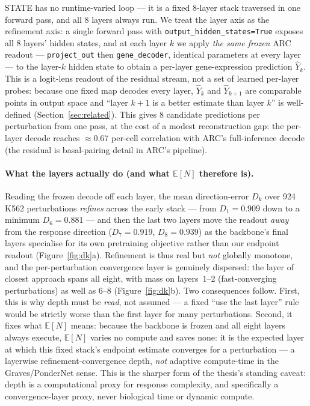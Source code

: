 \documentclass[11pt]{article}
\newcommand{\EN}{\ensuremath{\mathbb{E}[N]}}
\begin{document}
STATE has no runtime-varied loop --- it is a fixed 8-layer stack traversed in one forward pass,
and all 8 layers always run. We treat the layer axis as the refinement axis: a single forward pass
with \texttt{output\_hidden\_states=True} exposes all 8 layers' hidden states, and at each layer
$k$ we apply \emph{the same frozen} ARC readout --- \texttt{project\_out} then
\texttt{gene\_decoder}, identical parameters at every layer --- to the layer-$k$ hidden state to
obtain a per-layer gene-expression prediction $\hat{Y}_k$. This is a logit-lens readout of the
residual stream, not a set of learned per-layer probes: because one fixed map decodes every layer,
$\hat{Y}_k$ and $\hat{Y}_{k+1}$ are comparable points in output space and ``layer $k+1$ is a better
estimate than layer $k$'' is well-defined (Section~\ref{sec:related}). This gives 8 candidate
predictions per perturbation from one pass, at the cost of a modest reconstruction gap: the
per-layer decode reaches $\approx0.67$ per-cell correlation with ARC's full-inference decode (the
residual is basal-pairing detail in ARC's pipeline).

\paragraph{What the layers actually do (and what \EN{} therefore is).} Reading the frozen decode
off each layer, the mean direction-error $D_k$ over 924 K562 perturbations \emph{refines} across the
early stack --- from $D_1=0.909$ down to a minimum $D_6=0.881$ --- and then the last two layers move
the readout \emph{away} from the response direction ($D_7=0.919$, $D_8=0.939$) as the backbone's
final layers specialise for its own pretraining objective rather than our endpoint readout
(Figure~\ref{fig:dk}a). Refinement is thus real but \emph{not} globally monotone, and the
per-perturbation convergence layer is genuinely dispersed: the layer of closest approach spans all
eight, with mass on layers~1--2 (fast-converging perturbations) as well as 6--8
(Figure~\ref{fig:dk}b). Two consequences follow. First, this is why depth must be \emph{read}, not
assumed --- a fixed ``use the last layer'' rule would be strictly worse than the first layer for
many perturbations. Second, it fixes what \EN{} means: because the backbone is frozen and all eight
layers always execute, \EN{} varies no compute and saves none: it is the expected layer at which
this fixed stack's endpoint estimate converges for a perturbation --- a layerwise
refinement-convergence depth, \emph{not} adaptive compute-time in the Graves/PonderNet sense. This
is the sharper form of the thesis's standing caveat: depth is a computational proxy for response
complexity, and specifically a convergence-layer proxy, never biological time or dynamic compute.
\end{document}
